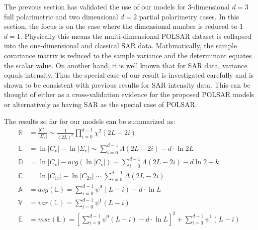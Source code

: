 \documentclass[journal]{IEEEtran}
\begin{document}
The prevous section has validated the use of our models for 3-dimensional $d=3$ full polarimetric and two dimensional $d=2$ partial polarimetry cases.
In this section, the focus is on the case where the dimensional number is reduced to 1 $d=1$.
Physically this means the multi-dimensional POLSAR dataset is collapsed into the one-dimensional and classical SAR data.
Mathmatically, the sample covariance matrix is reduced to the sample variance
  and the determinant equates the scalar value.
On another hand, it is well known that for SAR data, variance equals intensity.
Thus the special case of our result is investigated carefully and is shown to be consistent with previous results for SAR intensity data.
This can be thought of 
  either as a cross-validation evidence for the proposed POLSAR models
  or alternatively as having SAR as the special case of POLSAR. 

The results so far for our models can be summarized as:
\begin{align}
  \mathbb{R} &= \frac{|C_v|}{|\Sigma_v|} \sim \frac{1}{(2L)^d} \prod^{d-1}_{i=0} \chi^2(2L-2i) \\%
  \mathbb{L} &= \ln{|C_v|} - \ln{|\Sigma_v|} \sim \sum^{d-1}_{i=0} \Lambda(2L-2i) - d \cdot \ln{2L} \\ %
  \mathbb{D} &= \ln{|C_v|} - avg(\ln{|C_v|}) \sim \sum^{d-1}_{i=0} \Lambda(2L-2i) - d \ln{2} + k\\
  \mathbb{C} &= \ln{|C_{1v}|} - \ln{|C_{2v}|} \sim \sum^{d-1}_{i=0} \Delta(2L-2i) \\
  \mathbb{A} &= avg(\mathbb{L}) = \sum^{d-1}_{i=0} \psi^0(L-i) - d \cdot \ln{L} \\ %
  \mathbb{V} &= var(\mathbb{L}) = \sum^{d-1}_{i=0} \psi^1(L-i) \\ %
  \mathbb{E} &= mse(\mathbb{L}) =\left[ \sum^{d-1}_{i=0} \psi^0(L-i) - d \cdot \ln{L} \right]^2 +  \sum^{d-1}_{i=0} \psi^1(L-i) \label{eqn:polsar_dispersion_mse} 
\end{align}
\end{document}
